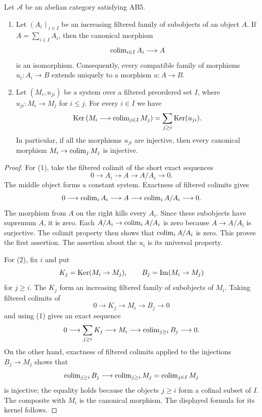 \begin{lemma}
\label{lemma-AB5-directed-unions}
\begin{reference}
\cite[Chapter I, \S 1.5 and Proposition 1.8, pp. 129 and 133--134]{Tohoku}
\end{reference}
Let $\mathcal{A}$ be an abelian category satisfying AB5.
\begin{enumerate}
\item Let $(A_i)_{i \in I}$ be an increasing filtered family of
subobjects of an object $A$. If $A = \sum_{i \in I} A_i$, then the
canonical morphism
$$
\mathop{\mathrm{colim}}\nolimits_{i \in I} A_i \longrightarrow A
$$
is an isomorphism. Consequently, every compatible family of morphisms
$u_i : A_i \to B$ extends uniquely to a morphism $u : A \to B$.
\item Let $(M_i, u_{ji})$ be a system over a filtered preordered set $I$,
where $u_{ji} : M_i \to M_j$ for $i \leq j$. For every $i \in I$ we have
$$
\mathop{\mathrm{Ker}}\left(M_i \longrightarrow \mathop{\mathrm{colim}}\nolimits_{j \in I} M_j\right)
=
\sum_{j \geq i} \mathop{\mathrm{Ker}}(u_{ji}).
$$
In particular, if all the morphisms $u_{ji}$ are injective, then every
canonical morphism $M_i \to \mathop{\mathrm{colim}}\nolimits_j M_j$ is injective.
\end{enumerate}
\end{lemma}

\begin{proof}
For (1), take the filtered colimit of the short exact sequences
$$
0 \longrightarrow A_i \longrightarrow A \longrightarrow A/A_i
\longrightarrow 0.
$$
The middle object forms a constant system. Exactness of filtered colimits
gives
$$
0 \longrightarrow \mathop{\mathrm{colim}}\nolimits_i A_i \longrightarrow A
\longrightarrow \mathop{\mathrm{colim}}\nolimits_i A/A_i \longrightarrow 0.
$$
The morphism from $A$ on the right kills every $A_i$. Since these subobjects
have supremum $A$, it is zero. Each $A/A_i \to \mathop{\mathrm{colim}}\nolimits_i A/A_i$ is zero
because $A \to A/A_i$ is surjective. The colimit property then shows that
$\mathop{\mathrm{colim}}\nolimits_i A/A_i$ is zero. This proves the first assertion. The assertion
about the $u_i$ is its universal property.

For (2), fix $i$ and put
$$
K_j = \mathop{\mathrm{Ker}}(M_i \to M_j), \qquad
B_j = \mathop{\mathrm{Im}}(M_i \to M_j)
$$
for $j \geq i$. The $K_j$ form an increasing filtered family of subobjects
of $M_i$. Taking filtered colimits of
$$
0 \longrightarrow K_j \longrightarrow M_i \longrightarrow B_j
\longrightarrow 0
$$
and using (1) gives an exact sequence
$$
0 \longrightarrow \sum_{j \geq i} K_j \longrightarrow M_i
\longrightarrow \mathop{\mathrm{colim}}\nolimits_{j \geq i} B_j \longrightarrow 0.
$$
On the other hand, exactness of filtered colimits applied to the injections
$B_j \to M_j$ shows that
$$
\mathop{\mathrm{colim}}\nolimits_{j \geq i} B_j \longrightarrow
\mathop{\mathrm{colim}}\nolimits_{j \geq i} M_j = \mathop{\mathrm{colim}}\nolimits_{j \in I} M_j
$$
is injective; the equality holds because the objects $j \geq i$ form a
cofinal subset of $I$. The composite with $M_i$ is the canonical morphism.
The displayed formula for its kernel follows.
\end{proof}

